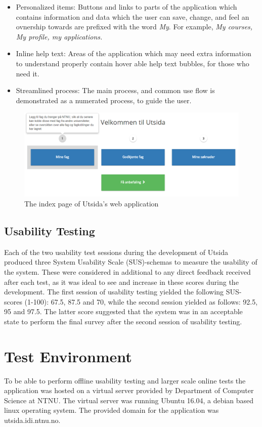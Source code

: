 \begin{itemize}
    \item Personalized items: Buttons and links to parts of the application which contains information and data which the user can save, change, and feel an ovnership towards are prefixed with the word \emph{My}. For example, \emph{My courses, My profile, my applications.}
    \item Inline help text: Areas of the application which may need extra information to understand properly contain hover able help text bubbles, for those who need it.
    \item Streamlined process: The main process, and common use flow is demonstrated as a numerated process, to guide the user.
\end{itemize}

\begin{figure}[h]
    \centering
    \includegraphics[width=1\textwidth]{fig/utsida_screenshots/steps.png}
    \caption{The index page of Utsida's web application}
    \label{fig:utsida_index}
\end{figure}

\subsection{Usability Testing}
Each of the two usability test sessions during the development of Utsida produced three System Usability Scale (SUS)-schemas to measure the usability of the system. These were considered in additional to any direct feedback received after each test, as it was ideal to see and increase in these scores during the development. The first session of usability testing yielded the following SUS-scores (1-100): 67.5, 87.5 and 70, while the second session yielded as follows: 92.5, 95 and 97.5. The latter score suggested that the system was in an acceptable state to perform the final survey after the second session of usability testing.

\section{Test Environment}
To be able to perform offline usability testing and larger scale online tests the application was hosted on a virtual server provided by Department of Computer Science at NTNU. The virtual server was running Ubuntu 16.04, a debian based linux operating system. The provided domain for the application was utsida.idi.ntnu.no.

